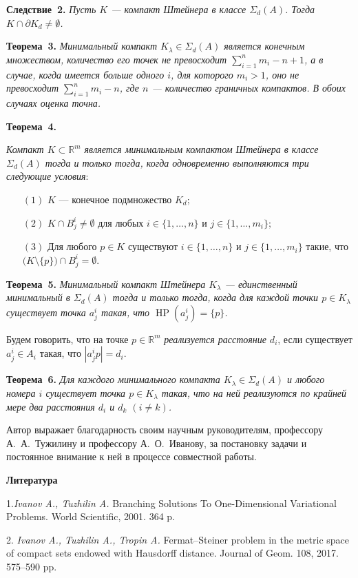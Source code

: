 \textbf{Следствие~2.} {\it Пусть $K$ --- компакт Штейнера в классе $\Sigma_d(A)$. Тогда $K\cap \partial K_d\neq \emptyset$.}

\textbf{Теорема~3.} {\it Минимальный компакт $K_\lambda \in \Sigma_d(A)$ является конечным множеством, количество его точек не превосходит $\sum_{i=1}^n m_i - n + 1$, а в случае, когда имеется больше одного $i$, для которого $m_i > 1$, оно не превосходит $\sum_{i=1}^n m_i - n$, где $n$ --- количество граничных компактов. В обоих случаях оценка точна.}

\textbf{Теорема~4.} {\it Компакт $K \subset {\mathbb R^m}$ является минимальным компактом Штейнера в классе $\Sigma_d(A)$ тогда и только тогда, когда одновременно выполняются три следующие условия$:$
	\begin{itemize}
		\item[$(1)$] $K$ --- конечное подмножество $K_d;$
		\item[$(2)$] $K\cap B_j^i\neq \emptyset$ для любых $i\in \{1,\ldots,n\}$ и $j\in \{1,\ldots,m_i\};$
		\item[$(3)$] Для любого $p \in K$ существуют $i\in \{1,\ldots,n\}$ и $j\in \{1,\ldots,m_i\}$ такие, что $\bigl(K\setminus \{p\}\bigr)\cap B_j^i=\emptyset$.
\end{itemize}}

\textbf{Теорема~5.} {\it Минимальный компакт Штейнера $K_\lambda$ --- единственный минимальный в $\Sigma_d(A)$ тогда и только тогда, когда для каждой точки $p \in K_\lambda$ существует точка $a^i_j$ такая, что $\operatorname{HP}(a^i_j)=\{p\}$.}

Будем говорить, что на точке $p\in \mathbb R^m$ \emph{реализуется расстояние $d_i$}, если существует $a_j^i\in A_i$ такая, что $|a_j^ip|=d_i$.

\textbf{Теорема~6.} {\it Для каждого минимального компакта $K_\lambda \in \Sigma_d(A)$ и любого номера $i$ существует точка $p\in K_\lambda$ такая, что на ней реализуются по крайней мере два расстояния $d_i$ и $d_k$ $(i\neq k)$.}

Автор выражает благодарность своим научным руководителям, профессору А.~А.~Тужилину и профессору А.~О.~Иванову, за постановку задачи и постоянное внимание к ней в процессе совместной работы.



\smallskip \centerline {\bf Литература} \nopagebreak

1.{\it Ivanov A., Tuzhilin A.} Branching Solutions To One-Dimensional Variational Problems. World Scientific, 2001. 364 p.

2. {\it Ivanov A., Tuzhilin A., Tropin A.} Fermat–Steiner problem in the metric space of compact sets endowed with Hausdorff distance. Journal of Geom. 108, 2017. 575--590 pp.

 